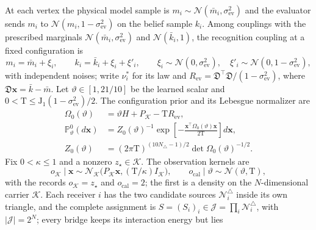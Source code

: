 At each vertex the physical model sample is \(m_i\sim\mathcal N(\bar m_i,
\sigma^2_{\mathrm{ev}})\) and the evaluator sends \(m_i\) to
\(\mathcal N(m_i,1-\sigma^2_{\mathrm{ev}})\) on the belief sample \(k_i\).
Among couplings with the prescribed marginals
\(\mathcal N(\bar m_i,\sigma^2_{\mathrm{ev}})\) and \(\mathcal N(\bar k_i,1)\),
the recognition coupling at a fixed configuration is
\begin{equation}
m_i=\bar m_i+\xi_i,\qquad
k_i=\bar k_i+\xi_i+\xi'_i,\qquad
\xi_i\sim\mathcal N(0,\sigma^2_{\mathrm{ev}}),\quad
\xi'_i\sim\mathcal N(0,1-\sigma^2_{\mathrm{ev}}),
\label{eq:rg-formation-evaluator-lift}
\end{equation}
with independent noises; write \(\nu_i^*\) for its law and
\(R_{\mathrm{ev}}=\mathfrak D^\top\mathfrak D/(1-\sigma^2_{\mathrm{ev}})\),
where \(\mathfrak D\mathbf x=\bar k-\bar m\). Let \(\vartheta\in[1,21/10]\) be
the learned scalar and \(0<\mathrm T\le\mathrm J_1(1-\sigma^2_{\mathrm{ev}})/2\).
The configuration prior and its Lebesgue normalizer are
\begin{equation}
\begin{aligned}
\Omega_0(\vartheta)&=\vartheta H+P_{\mathcal K}-\mathrm TR_{\mathrm{ev}},\\
\mathbb P^0_\vartheta(d\mathbf x)
&=Z_0(\vartheta)^{-1}
  \exp\left[-\frac{\mathbf x^\top\Omega_0(\vartheta)\mathbf x}{2\mathrm T}\right]d\mathbf x,\\
Z_0(\vartheta)&=(2\pi\mathrm T)^{(10N_\triangle-1)/2}\det\Omega_0(\vartheta)^{-1/2}.
\end{aligned}
\label{eq:rg-formation-physical-prior}
\end{equation}
Fix \(0<\kappa\le1\) and a nonzero \(z_\star\in\mathcal K\). The observation
kernels are
\begin{equation}
o_{\mathcal K}\mid\mathbf x\sim
  \mathcal N_{\mathcal K}\bigl(P_{\mathcal K}\mathbf x,(\mathrm T/\kappa)I_{\mathcal K}\bigr),
\qquad
o_{\mathrm{cal}}\mid\vartheta\sim\mathcal N(\vartheta,\mathrm T),
\label{eq:rg-formation-observation-kernels}
\end{equation}
with the records \(o_{\mathcal K}=z_\star\) and \(o_{\mathrm{cal}}=2\); the
first is a density on the \(N\)-dimensional carrier \(\mathcal K\). Each
receiver \(i\) has the two candidate sources \(\mathcal N_i^\triangle\) inside
its own triangle, and the complete assignment is
\(S=(S_i)_i\in\mathcal J=\prod_i\mathcal N_i^\triangle\), with
\(|\mathcal J|=2^N\); every bridge keeps its interaction energy but lies
